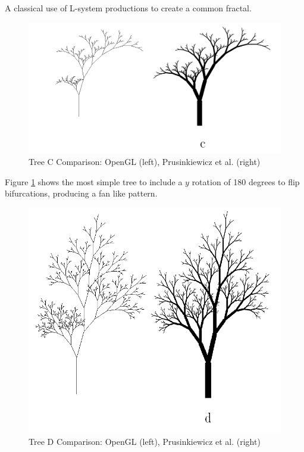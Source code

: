 \documentclass[final]{cmpreport}
\begin{document}
A classical use of L-system productions to create a common fractal. 

\begin{figure}[ht]
    \includegraphics[scale=0.4]{tree-comp-c.png} 
    \centering
    \captionsetup{justification=centering}
    \caption{Tree C Comparison: OpenGL (left), Prusinkiewicz et al. (right)}
    \label{fig:tree-comp-c}
\end{figure}

Figure \ref{fig:tree-comp-c} shows the most simple tree to include a $y$ rotation of 180 degrees to flip 
bifurcations, producing a fan like pattern.

\begin{figure}[ht]
    \includegraphics[scale=0.4]{tree-comp-d.png} 
    \centering
    \captionsetup{justification=centering}
    \caption{Tree D Comparison: OpenGL (left), Prusinkiewicz et al. (right)}
    \label{fig:tree-comp-d}
\end{figure}
\end{document}
